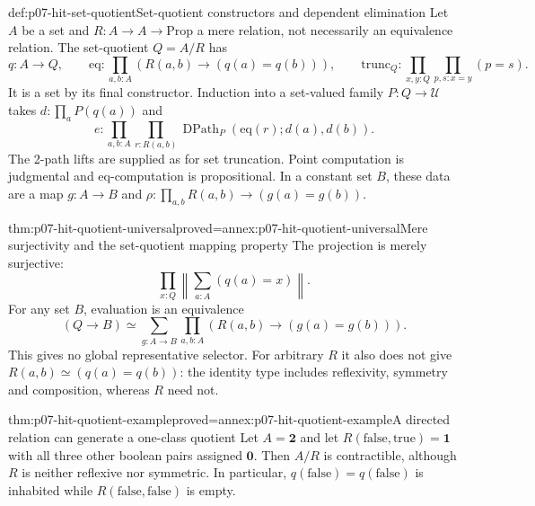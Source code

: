 \begin{hbdefinition}{def:p07-hit-set-quotient}{Set-quotient constructors and dependent elimination}
Let \(A\) be a set and \(R:A\to A\to\mathrm{Prop}\) a mere relation,
not necessarily an equivalence relation. The set-quotient \(Q=A/R\) has
\[
 q:A\to Q,\qquad
 \mathrm{eq}:\prod_{a,b:A}(R(a,b)\to(q(a)=q(b))),\qquad
 \mathrm{trunc}_Q:\prod_{x,y:Q}\prod_{p,s:x=y}(p=s).
\]
It is a set by its final constructor. Induction into a set-valued family
\(P:Q\to\mathcal U\) takes \(d:\prod_aP(q(a))\) and
\[
 e:\prod_{a,b:A}\prod_{r:R(a,b)}
             \operatorname{DPath}_P(\mathrm{eq}(r);d(a),d(b)).
\]
The 2-path lifts are supplied as for set truncation. Point computation is
judgmental and \(\mathrm{eq}\)-computation is propositional.
In a constant set \(B\), these data are a map \(g:A\to B\) and
\(\rho:\prod_{a,b}R(a,b)\to(g(a)=g(b))\).
\end{hbdefinition}

\begin{hbtheorem}{thm:p07-hit-quotient-universal}{proved=annex:p07-hit-quotient-universal}{Mere surjectivity and the set-quotient mapping property}
The projection is merely surjective:
\[
 \prod_{x:Q}\left\|\sum_{a:A}(q(a)=x)\right\|.
\]
For any set \(B\), evaluation is an equivalence
\[
 (Q\to B)\simeq
 \sum_{g:A\to B}\prod_{a,b:A}(R(a,b)\to(g(a)=g(b))).
\]
This gives no global representative selector. For arbitrary \(R\) it also
does not give \(R(a,b)\simeq(q(a)=q(b))\): the identity type includes
reflexivity, symmetry and composition, whereas \(R\) need not.
\end{hbtheorem}

\begin{hbtheorem}{thm:p07-hit-quotient-example}{proved=annex:p07-hit-quotient-example}{A directed relation can generate a one-class quotient}
Let \(A=\mathbf2\) and let \(R(\mathrm{false},\mathrm{true})=\mathbf1\)
with all three other boolean pairs assigned \(\mathbf0\).
Then \(A/R\) is contractible, although \(R\) is neither reflexive nor
symmetric. In particular, \(q(\mathrm{false})=q(\mathrm{false})\)
is inhabited while \(R(\mathrm{false},\mathrm{false})\) is empty.
\end{hbtheorem}

